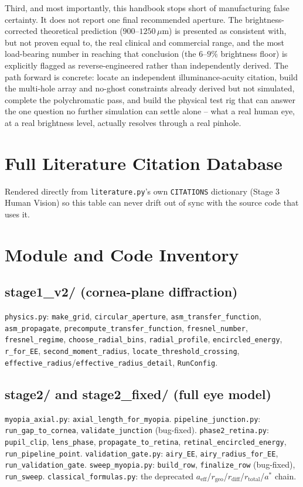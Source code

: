 \documentclass[11pt]{report}
\newcommand{\aeff}{a_{\text{eff}}}
\newcommand{\rgeo}{r_{\text{geo}}}
\newcommand{\rdiff}{r_{\text{diff}}}
\newcommand{\rtotal}{r_{\text{total}}}
\begin{document}
Third, and most importantly, this handbook stops short of manufacturing false certainty. It does not report one final recommended aperture. The brightness-corrected theoretical prediction ($900$--$1250\,\mu$m) is presented as consistent with, but not proven equal to, the real clinical and commercial range, and the most load-bearing number in reaching that conclusion (the $6$--$9\%$ brightness floor) is explicitly flagged as reverse-engineered rather than independently derived. The path forward is concrete: locate an independent illuminance-acuity citation, build the multi-hole array and no-ghost constraints already derived but not simulated, complete the polychromatic pass, and build the physical test rig that can answer the one question no further simulation can settle alone -- what a real human eye, at a real brightness level, actually resolves through a real pinhole.

\appendix
\chapter{Full Literature Citation Database}
\label{app:literature}
Rendered directly from \texttt{literature.py}'s own \texttt{CITATIONS} dictionary (Stage 3 Human Vision) so this table can never drift out of sync with the source code that uses it.



\chapter{Module and Code Inventory}
\label{app:modules}

\section*{stage1\_v2/ (cornea-plane diffraction)}
\texttt{physics.py}: \texttt{make\_grid}, \texttt{circular\_aperture}, \texttt{asm\_transfer\_function}, \texttt{asm\_propagate}, \texttt{precompute\_transfer\_function}, \texttt{fresnel\_number}, \texttt{fresnel\_regime}, \texttt{choose\_radial\_bins}, \texttt{radial\_profile}, \texttt{encircled\_energy}, \texttt{r\_for\_EE}, \texttt{second\_moment\_radius}, \texttt{locate\_threshold\_crossing}, \texttt{effective\_radius}/\texttt{effective\_radius\_detail}, \texttt{RunConfig}.

\section*{stage2/ and stage2\_fixed/ (full eye model)}
\texttt{myopia\_axial.py}: \texttt{axial\_length\_for\_myopia}. \texttt{pipeline\_junction.py}: \texttt{run\_gap\_to\_cornea}, \texttt{validate\_junction} (bug-fixed). \texttt{phase2\_retina.py}: \texttt{pupil\_clip}, \texttt{lens\_phase}, \texttt{propagate\_to\_retina}, \texttt{retinal\_encircled\_energy}, \texttt{run\_pipeline\_point}. \texttt{validation\_gate.py}: \texttt{airy\_EE}, \texttt{airy\_radius\_for\_EE}, \texttt{run\_validation\_gate}. \texttt{sweep\_myopia.py}: \texttt{build\_row}, \texttt{finalize\_row} (bug-fixed), \texttt{run\_sweep}. \texttt{classical\_formulas.py}: the deprecated $\aeff$/$\rgeo$/$\rdiff$/$\rtotal$/$a^*$ chain.
\end{document}
